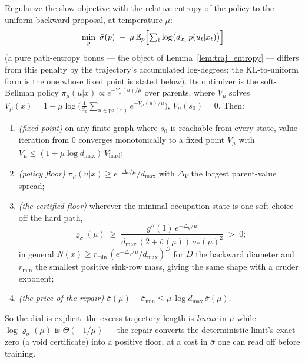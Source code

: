 \begin{proposition}\label{prop:soft_ssp}
Regularize the slow objective with the relative entropy of the policy to the uniform
backward proposal, at temperature $\mu$:
\begin{equation*}
    \min_p\ \bar\sigma(p)\;+\;\mu\,\mathbb E_p\Bigl[\textstyle\sum_t
    \log\bigl(d_{x_t}\,p(u_t|x_t)\bigr)\Bigr]
\end{equation*}
(a pure path-entropy bonus --- the object of Lemma~\ref{lem:traj_entropy} --- differs
from this penalty by the trajectory's accumulated log-degrees; the KL-to-uniform form
is the one whose fixed point is stated below). Its optimizer is the soft-Bellman policy
$\pi_\mu(u|x)\propto e^{-V_\mu(u)/\mu}$ over parents, where $V_\mu$
solves $V_\mu(x) = 1-\mu\log\bigl(\tfrac1{d_x}\sum_{u\in\mathrm{pa}(x)}
e^{-V_\mu(u)/\mu}\bigr)$, $V_\mu(s_0)=0$. Then:
\begin{enumerate}
    \item \emph{(fixed point)} on any finite graph where $s_0$ is reachable from every
    state, value iteration from $0$ converges monotonically to a fixed point $V_\mu$
    with $V_\mu\leq(1+\mu\log d_{\max})\,V_{\mathrm{hard}}$;
    \item \emph{(policy floor)} $\pi_\mu(u|x)\geq e^{-\Delta_V/\mu}/d_{\max}$ with
    $\Delta_V$ the largest parent-value spread;
    \item \emph{(the certified floor)} wherever the minimal-occupation state is one soft
    choice off the hard path,
    \begin{equation*}
        \varrho_\sigma(\mu)\;\geq\;
        \frac{g''(1)\,e^{-\Delta_V/\mu}}{d_{\max}\,(2+\bar\sigma(\mu))\,\sigma_*(\mu)^2}
        \;>\;0 ;
    \end{equation*}
    in general $N(x)\geq r_{\min}\,(e^{-\Delta_V/\mu}/d_{\max})^{D}$ for $D$ the
    backward diameter and $r_{\min}$ the smallest positive sink-row mass, giving the
    same shape with a cruder exponent;
    \item \emph{(the price of the repair)} $\bar\sigma(\mu)-\bar\sigma_{\min} \leq
    \mu\,\log d_{\max}\,\bar\sigma(\mu)$.
\end{enumerate}
So the dial is explicit: the excess trajectory length is \emph{linear} in $\mu$ while
$\log\varrho_\sigma(\mu)$ is $\Theta(-1/\mu)$ --- the repair converts the deterministic
limit's exact zero (a void certificate) into a positive floor, at a cost in $\bar\sigma$
one can read off before training.
\end{proposition}

